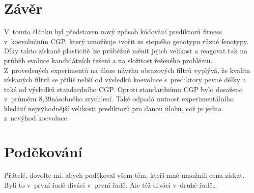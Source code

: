 \documentclass[fleqn,11pt]{ExcelAtFIT} %
\begin{document}
\section{Závěr}
\label{sec:Conclusions}

V~tomto článku byl představen nový způsob kódování prediktorů fitness v~koevolučním CGP, který umožňuje tvořit ze stejného genotypu různé fenotypy. Díky takto získaně plasticitě lze průběžně měnit jejich velikost a reagovat tak na průběh evoluce kandidátních řešení a na složitost řešeného problému. Z~provedených experimentů na úloze návrhu obrazových filtrů vyplývá, že kvalita získaných filtrů se příliš neliší od výsledků koevoluce s~prediktory pevné délky a také od výsledků standardního CGP. Oproti standardnímu CGP bylo dosaženo v~průměru 8,39násobného zrychlení. Také odpadá nutnost experimentálního hledání nejvýhodnější velikosti prediktorů pro danou úlohu, což je jedna z~nevýhod koevoluce.


\section*{Poděkování}
\label{sec:Acknowledgements}


{\color{fixme}Přátelé, dovolte mi, abych poděkoval všem těm, kteří mně umožnili cenu získat. Byli to v~první řadě diváci v~první řadě. Ale též diváci v~druhé řadě\ldots}





\end{document}
